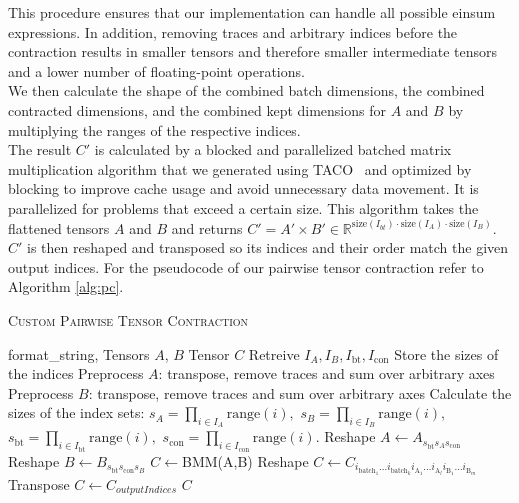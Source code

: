 This procedure ensures that our implementation can handle all possible einsum expressions. In addition, removing traces and arbitrary indices before the contraction results in smaller tensors and therefore smaller intermediate tensors and a lower number of floating-point operations.\\
 We then calculate the shape of the combined batch dimensions, the combined contracted dimensions, and the combined kept dimensions for $A$ and $B$ by multiplying the ranges of the respective indices.\\
 The result $C'$ is calculated by a blocked and parallelized batched matrix multiplication algorithm that we generated using TACO~\cite{kjolstad2017taco} and optimized by blocking to improve cache usage and avoid unnecessary data movement. It is parallelized for problems that exceed a certain size. This algorithm takes the flattened tensors $A$ and $B$ and returns  $C' = A' \times B' \in \mathbb{R}^{\text{size}(I_{bt}) \cdot \text{size}(I_A) \cdot \text{size}(I_B)}$. $C'$ is then reshaped and transposed so its indices and their order match the given output indices. For the pseudocode of our pairwise tensor contraction refer to Algorithm \ref{alg:pc}.  \\
 \begin{algorithm}[H]
    \caption{\textsc{Custom Pairwise Tensor Contraction}}
        \label{alg:pc}
    \begin{algorithmic}[1]
        \REQUIRE format\_string, Tensors $A$, $B$
            \ENSURE Tensor $C$
            \STATE Retreive $I_A , I_B , I_{\text{bt}} , I_{\text{con}}$
            \STATE Store the sizes of the indices
            \STATE Preprocess $A$: transpose, remove traces and sum over arbitrary axes
            \STATE Preprocess $B$: transpose, remove traces and sum over arbitrary axes
            \STATE Calculate the sizes of the index sets: $s_A = \textstyle{\prod\limits_{i\in I_A} \text{range}(i)},$ 
            \STATE $s_B = \textstyle{\prod\limits_{i\in I_B} \text{range}(i)},$ 
            \STATE $s_{\text{bt}} = \textstyle{\prod\limits_{i\in I_{\text{bt}}} \text{range}(i)},$ 
            \STATE $s_{\text{con}} = \textstyle{\prod\limits_{i\in I_{\text{con}}} \text{range}(i)}.$
            \STATE Reshape $A \leftarrow A_{s_{\text{bt}} s_A s_{\text{con}}}$
            \STATE Reshape $B \leftarrow B_{s_{\text{bt}} s_{\text{con}} s_B}$
            \STATE $C\leftarrow$\textsc{BMM}(A,B)
            \STATE Reshape $C\leftarrow C_{i_{\text{batch}_1}...i_{\text{batch}_k} i_{\text{A}_1} ...i_{\text{A}_l} i_{\text{B}_1} ...i_{\text{B}_m}}$
            \STATE Transpose $C\leftarrow C_{outputIndices}$
            \RETURN $C$
    \end{algorithmic}
\end{algorithm}
    
